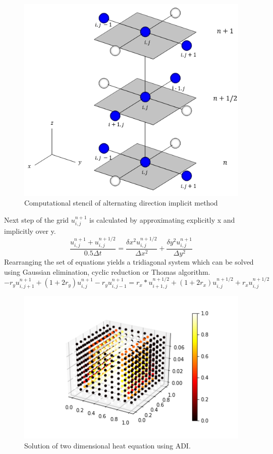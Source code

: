 \documentclass[12pt, oneside]{book}
\theoremstyle{plain}
\theoremstyle{definition}
\begin{document}
\begin{figure}[!htb]
    \centering
        \includegraphics[scale=0.7]{ADI.png}
    \caption{Computational stencil of alternating direction implicit method}
\end{figure}

Next step of the grid $u^{n+1}_{i,j}$ is calculated by approximating explicitly x and implicitly over y.
\begin{equation}
\frac{u^{n+1}_{i,j} + u^{n+1/2}_{i,j}}{0.5 \Delta t} = \frac{\delta x^2 u^{n+1/2}_{i,j} }{\Delta x^2} + \frac{\delta y^2 u^{n+1}_{i,j}}{\Delta y^2}
\end{equation}
Rearranging the set of equations yields a tridiagonal system which can be solved using Gaussian elimination, cyclic reduction or Thomas algorithm.
\begin{equation}
-r_y u^{n+1}_{i,j+1} + (1 + 2r_y) u^{n+1}_{i,j} - r_y u^{n+1}_{i,j-1} = r_x * u^{n+1/2}_{i+1,j} + (1 + 2r_x) u^{n+1/2}_{i,j} + r_x u^{n+1/2}_{i,j}
\end{equation}


\begin{figure}[!htb]
    \centering
        \includegraphics[scale=0.6]{ADIHeat.png}
    \caption{Solution of two dimensional heat equation using ADI.}
\end{figure}
\end{document}
